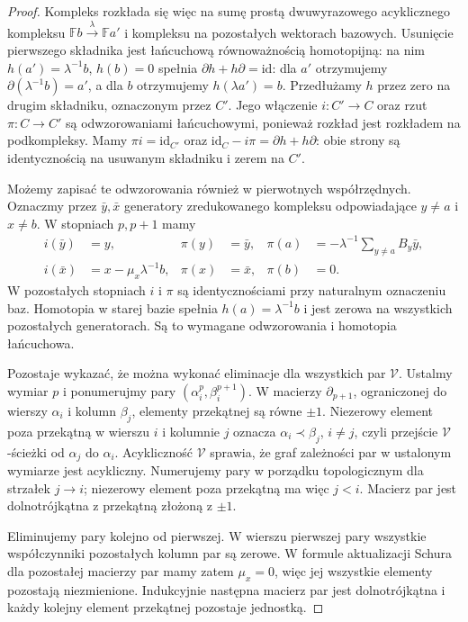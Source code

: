 \begin{proof}
Kompleks rozkłada się więc na sumę prostą
dwuwyrazowego acyklicznego kompleksu
$\mathbb F b\xrightarrow{\lambda}\mathbb F a'$
i kompleksu na pozostałych wektorach bazowych.
Usunięcie pierwszego składnika jest łańcuchową
równoważnością homotopijną: na nim
$h(a')=\lambda^{-1}b$, $h(b)=0$ spełnia
$\partial h+h\partial=\mathrm{id}$:
dla $a'$ otrzymujemy $\partial(\lambda^{-1}b)=a'$,
a dla $b$ otrzymujemy $h(\lambda a')=b$.
Przedłużamy $h$ przez zero na drugim składniku,
oznaczonym przez $C'$. Jego włączenie
$i:C'\to C$ oraz rzut $\pi:C\to C'$ są
odwzorowaniami łańcuchowymi, ponieważ rozkład
jest rozkładem na podkompleksy.
Mamy $\pi i=\mathrm{id}_{C'}$ oraz
$\mathrm{id}_C-i\pi=\partial h+h\partial$:
obie strony są identycznością na usuwanym
składniku i zerem na $C'$.

Możemy zapisać te odwzorowania również w
pierwotnych współrzędnych. Oznaczmy przez
$\bar y,\bar x$ generatory zredukowanego kompleksu
odpowiadające $y\ne a$ i $x\ne b$.
W stopniach $p,p+1$ mamy
\[
\begin{aligned}
 i(\bar y)&=y,&
 \pi(y)&=\bar y,&
 \pi(a)&=-\lambda^{-1}\sum_{y\ne a}B_y\bar y,\\
 i(\bar x)&=x-\mu_x\lambda^{-1}b,&
 \pi(x)&=\bar x,&
 \pi(b)&=0.
\end{aligned}
\]
W pozostałych stopniach $i$ i $\pi$ są
identycznościami przy naturalnym oznaczeniu baz.
Homotopia w starej bazie spełnia
$h(a)=\lambda^{-1}b$ i jest zerowa na wszystkich
pozostałych generatorach. Są to wymagane
odwzorowania i homotopia łańcuchowa.

Pozostaje wykazać, że można wykonać eliminacje
dla wszystkich par $\mathcal V$.
Ustalmy wymiar $p$ i ponumerujmy pary
$(\alpha_i^p,\beta_i^{p+1})$.
W macierzy $\partial_{p+1}$, ograniczonej
do wierszy $\alpha_i$ i kolumn $\beta_j$,
elementy przekątnej są równe $\pm1$.
Niezerowy element poza przekątną w wierszu $i$
i kolumnie $j$ oznacza $\alpha_i\prec\beta_j$,
$i\ne j$, czyli przejście $\mathcal V$-ścieżki
od $\alpha_j$ do $\alpha_i$.
Acykliczność $\mathcal V$ sprawia, że graf
zależności par w ustalonym wymiarze jest
acykliczny. Numerujemy pary w porządku topologicznym
dla strzałek $j\to i$; niezerowy element poza
przekątną ma więc $j<i$. Macierz par jest dolnotrójkątna
z przekątną złożoną z $\pm1$.

Eliminujemy pary kolejno od pierwszej. W wierszu
pierwszej pary wszystkie współczynniki pozostałych
kolumn par są zerowe. W formule aktualizacji Schura
dla pozostałej macierzy par mamy zatem $\mu_x=0$,
więc jej wszystkie elementy pozostają niezmienione.
Indukcyjnie następna macierz par jest dolnotrójkątna
i każdy kolejny element przekątnej pozostaje jednostką.


\end{proof}
